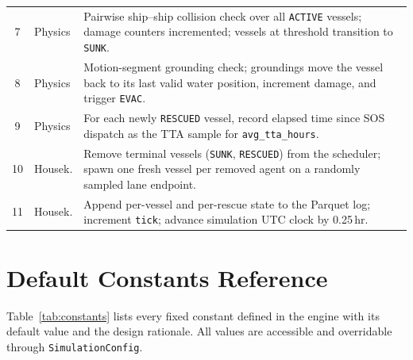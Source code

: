 \documentclass[cameraready]{Interspeech}
\begin{document}
\begin{table}[htbp]
\begin{tabularx}{\textwidth}{@{}c l X@{}}
        7 & Physics & Pairwise ship--ship collision check over all \texttt{ACTIVE} vessels; damage counters incremented; vessels at threshold transition to \texttt{SUNK}. \\[2pt]
        8 & Physics & Motion-segment grounding check; groundings move the vessel back to its last valid water position, increment damage, and trigger \texttt{EVAC}. \\[2pt]
        9 & Physics & For each newly \texttt{RESCUED} vessel, record elapsed time since SOS dispatch as the TTA sample for \texttt{avg\_tta\_hours}. \\[2pt]
        10 & Housek. & Remove terminal vessels (\texttt{SUNK}, \texttt{RESCUED}) from the scheduler; spawn one fresh vessel per removed agent on a randomly sampled lane endpoint. \\[2pt]
        11 & Housek. & Append per-vessel and per-rescue state to the Parquet log; increment \texttt{tick}; advance simulation UTC clock by 0.25\,hr. \\
        \bottomrule
    \end{tabularx}
\end{table}


\section{Default Constants Reference}
\label{apx:constants}

Table~\ref{tab:constants} lists every fixed constant defined in the engine with its default value and the design rationale. All values are accessible and overridable through \texttt{SimulationConfig}.
\end{document}
